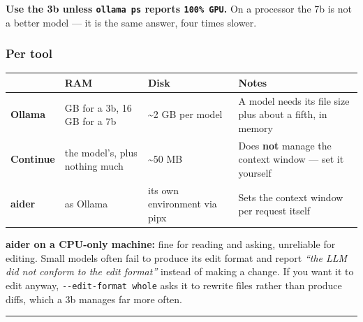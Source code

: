 \documentclass[
  letterpaper,
  10pt,
  twoside,
  openright,
  numbers=noenddot,
  chapterprefix=true]{scrbook}
\begin{document}
\textbf{Use the 3b unless \texttt{ollama\ ps} reports
\texttt{100\%\ GPU}.} On a processor the 7b is not a better model --- it
is the same answer, four times slower.

\subsubsection{Per tool}\label{per-tool}

\begin{longtable}[]{@{}
  >{\raggedright\arraybackslash}p{}
  >{\raggedright\arraybackslash}p{}
  >{\raggedright\arraybackslash}p{}
  >{\raggedright\arraybackslash}p{}@{}}
\toprule\noalign{}
\begin{minipage}[b]{\linewidth}\raggedright
\end{minipage} & \begin{minipage}[b]{\linewidth}\raggedright
RAM
\end{minipage} & \begin{minipage}[b]{\linewidth}\raggedright
Disk
\end{minipage} & \begin{minipage}[b]{\linewidth}\raggedright
Notes
\end{minipage} \\
\midrule\noalign{}
\endhead
\bottomrule\noalign{}
\endlastfoot
\textbf{Ollama} & 8 GB for a 3b, 16 GB for a 7b & \textasciitilde2 GB
per model & A model needs its file size plus about a fifth, in memory \\
\textbf{Continue} & the model's, plus nothing much & \textasciitilde50
MB & Does \textbf{not} manage the context window --- set it yourself \\
\textbf{aider} & as Ollama & its own environment via pipx & Sets the
context window per request itself \\
\end{longtable}

\textbf{aider on a CPU-only machine:} fine for reading and asking,
unreliable for editing. Small models often fail to produce its edit
format and report \emph{``the LLM did not conform to the edit format''}
instead of making a change. If you want it to edit anyway,
\texttt{-\/-edit-format\ whole} asks it to rewrite files rather than
produce diffs, which a 3b manages far more often.

\begin{center}\rule{0.5\linewidth}{0.5pt}\end{center}
\end{document}
